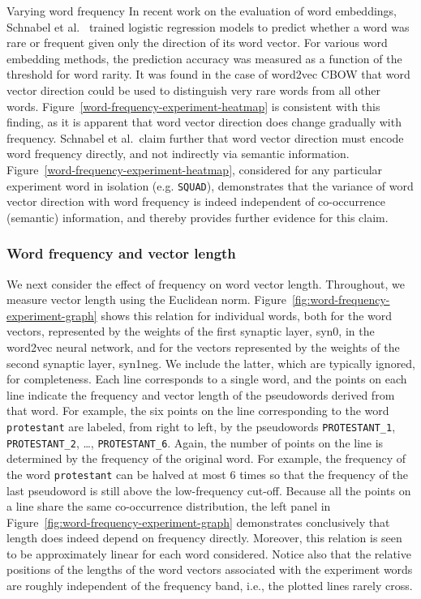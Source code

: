 \documentclass{article} %
\newcommand{\word}[1]{\texttt{#1}}
\begin{document}
\begin{section}{Varying word frequency}
In recent work on the evaluation of word embeddings, Schnabel et
al.~\cite{schnabelemnlp2015} trained logistic regression models to
predict whether a word was rare or frequent given only the direction of
its word vector.  For various word embedding methods, the prediction
accuracy was measured as a function of the threshold for word rarity.
It was found in the case of word2vec CBOW that word vector direction
could be used to distinguish very rare words from all other words.
Figure~\ref{word-frequency-experiment-heatmap} is consistent with this finding,
as it is apparent that word vector direction does change gradually with
frequency.  Schnabel et al.\ claim further that word vector direction must
encode word frequency directly, and not indirectly via semantic information.
Figure~\ref{word-frequency-experiment-heatmap}, considered for any particular
experiment word in isolation (e.g. \word{SQUAD}), demonstrates that the variance of word
vector direction with word frequency is indeed independent
of co-occurrence (semantic) information, and thereby provides further evidence
for this claim. 

\subsubsection{Word frequency and vector length}
We next consider the effect of frequency on word vector length.
Throughout, we measure vector length using the Euclidean norm.
Figure~\ref{fig:word-frequency-experiment-graph} shows this relation for
individual words, both for the word vectors, represented by the weights
of the first synaptic layer, syn0, in the word2vec neural network, and
for the vectors represented by the weights of the second synaptic layer,
syn1neg.  We include the latter, which are typically ignored, for
completeness.  Each line corresponds to a single word, and the points on
each line indicate the frequency and vector length of the pseudowords derived
from that word.  For example, the six points on the line corresponding
to the word \word{protestant} are labeled, from right to left, by the
pseudowords \word{PROTESTANT\_1}, \word{PROTESTANT\_2}, \dots,
\word{PROTESTANT\_6}.  Again, the number of points on the line is
determined by the frequency of the original word.  For example, the
frequency of the word \word{protestant} can be halved at most $6$ times
so that the frequency of the last pseudoword is still above the low-frequency
cut-off.  Because all the points on a line share the same co-occurrence
distribution, the left panel in
Figure~\ref{fig:word-frequency-experiment-graph} demonstrates
conclusively that length does indeed depend on frequency directly.
Moreover, this relation is seen to be approximately linear for each word
considered.  Notice also that the relative positions of the lengths of
the word vectors associated with the experiment words are roughly
independent of the frequency band, i.e., the plotted lines rarely cross.


\end{section}
\end{document}
